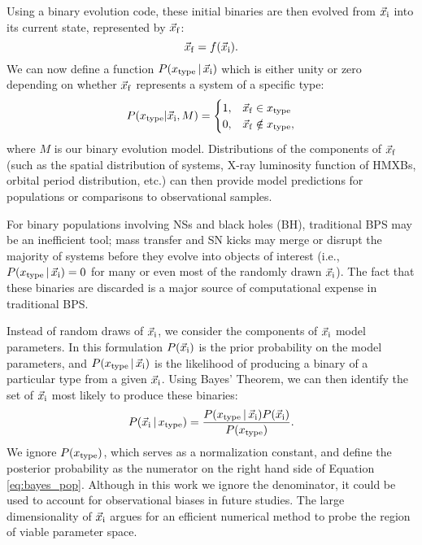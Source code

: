 \documentclass[usenatbib]{mnras}
\newcommand{\given}{\,|\,}
\begin{document}
Using a binary evolution code, these initial binaries are then evolved from $\vec{x}_{\rm i}$ into its current state, represented by $\vec{x}_{\rm f}$:
\begin{equation}
\vec{x}_{\rm f} = f(\vec{x}_{\rm i}). \label{eq:xf_xi}
\end{equation}
We can now define a function $P(x_{\rm type} \given \vec{x}_{\rm i})$ which is either unity or zero depending on whether $\vec{x}_{\rm f}$ represents a system of a specific type:
\begin{equation}
P(x_{\rm type} | \vec{x}_{\rm i}, M) = 
\begin{cases}
1, & \vec{x}_{\rm f} \in x_{\rm type} \\
0, & \vec{x}_{\rm f} \notin x_{\rm type},
\end{cases}
\end{equation}
where $M$ is our binary evolution model. Distributions of the components of $\vec{x}_{\rm f}$ (such as the spatial distribution of systems, X-ray luminosity function of HMXBs, orbital period distribution, etc.) can then provide model predictions for populations or comparisons to observational samples.




For binary populations involving NSs and black holes (BH), traditional BPS may be an inefficient tool; mass transfer and SN kicks may merge or disrupt the majority of systems before they evolve into objects of interest (i.e., $P(x_{\rm type} \given \vec{x}_{\rm i}) = 0$ for many or even most of the randomly drawn $\vec{x}_{\rm i}$). The fact that these binaries are discarded is a major source of computational expense in traditional BPS. 







Instead of random draws of $\vec{x}_{\rm i}$, we consider the components of $\vec{x}_{\rm i}$ model parameters. In this formulation $P(\vec{x}_{\rm i})$ is the prior probability on the model parameters, and $P(x_{\rm type} \given \vec{x}_{\rm i})$ is the likelihood of producing a binary of a particular type from a given $\vec{x}_{\rm i}$. Using Bayes' Theorem, we can then identify the set of $\vec{x}_{\rm i}$ most likely to produce these binaries:
\begin{equation}
P(\vec{x}_{\rm i} \given x_{\rm type}) = \frac{P(x_{\rm type} \given \vec{x}_{\rm i}) P(\vec{x}_{\rm i})} {P(x_{\rm type})}. \label{eq:bayes_pop}
\end{equation}
We ignore $P(x_{\rm type})$, which serves as a normalization constant, and define the posterior probability as the numerator on the right hand side of Equation \ref{eq:bayes_pop}. Although in this work we ignore the denominator, it could be used to account for observational biases in future studies. The large dimensionality of $\vec{x}_{\rm i}$ argues for an efficient numerical method to probe the region of viable parameter space.
\end{document}
